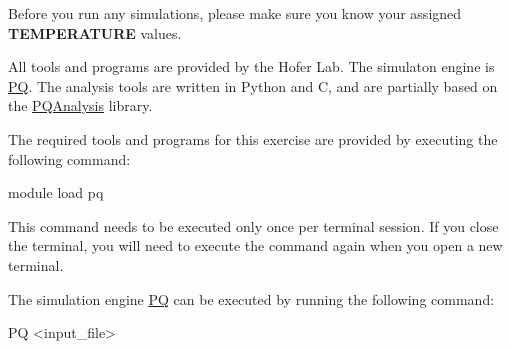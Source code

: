 \documentclass[
  letterpaper,
]{article}
\newenvironment{Shaded}{\begin{snugshade}}{\end{snugshade}}
\newcommand{\ExtensionTok}[1]{\textcolor[rgb]{0.00,0.23,0.31}{#1}}
\newcommand{\NormalTok}[1]{\textcolor[rgb]{0.00,0.23,0.31}{#1}}
\newcommand{\OperatorTok}[1]{\textcolor[rgb]{0.37,0.37,0.37}{#1}}
\begin{document}
\begin{tcolorbox}[enhanced jigsaw, opacitybacktitle=0.6, colback=white, rightrule=.15mm, bottomrule=.15mm, coltitle=black, toprule=.15mm, bottomtitle=1mm, arc=.35mm, colframe=quarto-callout-important-color-frame, opacityback=0, toptitle=1mm, breakable, titlerule=0mm, left=2mm, title=\textcolor{quarto-callout-important-color}{\faExclamation}\hspace{0.5em}{Important}, leftrule=.75mm, colbacktitle=quarto-callout-important-color!10!white]

Before you run any simulations, please make sure you know your assigned
\textbf{TEMPERATURE} values.

\end{tcolorbox}

All tools and programs are provided by the Hofer Lab. The simulaton
engine is \href{https://github.com/MolarVerse/PQ}{PQ}. The analysis
tools are written in Python and C, and are partially based on the
\href{https://github.com/MolarVerse/PQAnalysis}{PQAnalysis} library.

The required tools and programs for this exercise are provided by
executing the following command:

\begin{Shaded}
\begin{Highlighting}[]
\ExtensionTok{module}\NormalTok{ load pq}
\end{Highlighting}
\end{Shaded}

\begin{tcolorbox}[enhanced jigsaw, opacitybacktitle=0.6, colback=white, rightrule=.15mm, bottomrule=.15mm, coltitle=black, toprule=.15mm, bottomtitle=1mm, arc=.35mm, colframe=quarto-callout-important-color-frame, opacityback=0, toptitle=1mm, breakable, titlerule=0mm, left=2mm, title=\textcolor{quarto-callout-important-color}{\faExclamation}\hspace{0.5em}{Important}, leftrule=.75mm, colbacktitle=quarto-callout-important-color!10!white]

This command needs to be executed only once per terminal session. If you
close the terminal, you will need to execute the command again when you
open a new terminal.

\end{tcolorbox}

The simulation engine \href{https://github.com/MolarVerse/PQ}{PQ} can be
executed by running the following command:

\begin{Shaded}
\begin{Highlighting}[]
\ExtensionTok{PQ} \OperatorTok{\textless{}}\NormalTok{input\_file}\OperatorTok{\textgreater{}}
\end{Highlighting}
\end{Shaded}
\end{document}
